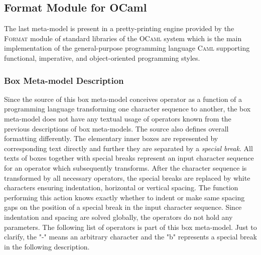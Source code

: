 \documentclass[12pt,notitlepage,a4paper]{report}
\begin{document}
\subsection {Format Module for OCaml}

The last meta-model is present in a pretty-printing engine provided by the \textsc{Format} module of standard libraries of the \textsc{OCaml} system which is the main implementation of the general-purpose programming language \textsc{Caml} supporting functional, imperative, and object-oriented programming styles.

\subsubsection{Box Meta-model Description}
Since the source of this box meta-model conceives operator as a function of a programming language transforming one character sequence to another, the box meta-model does not have any textual usage of operators known from the previous descriptions of box meta-models. The source also defines overall formatting differently. The elementary inner boxes are represented by corresponding text directly and further they are separated by a \textit{special break}. All texts of boxes together with special breaks represent an input character sequence for an operator which subsequently transforms. After the character sequence is transformed by all necessary operators, the special breaks are replaced by white characters ensuring indentation, horizontal or vertical spacing. The function performing this action knows exactly whether to indent or make same spacing gaps on the position of a special break in the input character sequence. Since indentation and spacing are solved globally, the operators do not hold any parameters. The following list of operators is part of this box meta-model. Just to clarify, the "-" means an arbitrary character and the "b" represents a special break in the following description.
\end{document}
